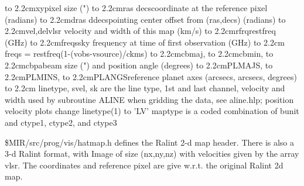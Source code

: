 {\parskip=0.0cm
\def\bbox#1{\hbox to 2.2cm{#1\hfil}}
\bbox{xy}pixel size (") \newline
\bbox{ras decs}coordinate at the reference pixel (radians) \newline
\bbox{dras ddecs}pointing center offset from (ras,decs) (radians) \newline
\bbox{vel,delv}lsr velocity and width of this map (km/s) \newline
\bbox{rfrq}restfreq (GHz) \newline
\bbox{freqs}sky frequency at time of first observation (GHz) \newline
\bbox{ }freqs = restfreq(1-(vobs-vsource)/ckms) \newline
\bbox{cbmaj,} \newline
\bbox{cbmin,} \newline
\bbox{cbpa}beam size (") and position angle (degrees) \newline
\bbox{PLMAJS,} \newline
\bbox{PLMINS,} \newline
\bbox{PLANGS}reference planet axes (arcsecs, arcsecs, degrees) \newline
\bbox{ } \newline
}
linetype, svel, sk are the line type, 1st and last channel, velocity and
width used by subroutine ALINE when gridding the data, see aline.hlp;
position velocity plots change linetype(1) to 'LV' \newline
maptype is a coded combination of bunit and ctype1, ctype2, and ctype3

\$MIR/src/prog/vis/hatmap.h defines the Ralint 2-d map header.  There is also
a 3-d Ralint format, with Image of size (nx,ny,nz) with velocities given by
the array vlsr. \newline
The coordinates and reference pixel are give w.r.t. the original Ralint
2d map.
